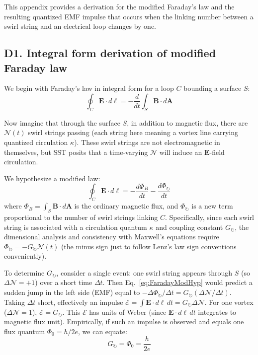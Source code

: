 \documentclass[10pt,reprint,aps,onecolumn,nofootinbib]{revtex4-2}
\begin{document}

This appendix provides a derivation for the modified Faraday’s law and the resulting quantized EMF impulse that occurs when the linking number between a swirl string and an electrical loop changes by one.

\subsection*{D1. Integral form derivation of modified Faraday law}

We begin with Faraday’s law in integral form for a loop $C$ bounding a surface $S$:
\begin{equation}
\oint_{C} \mathbf{E}\cdot d\bm{\ell} = -\frac{d}{dt}\int_{S} \mathbf{B}\cdot d\mathbf{A}
\label{eq:FaradayIntegral}
\end{equation}

Now imagine that through the surface $S$, in addition to magnetic flux, there are $\mathcal{N}(t)$ swirl strings passing (each string here meaning a vortex line carrying quantized circulation $\kappa$). These swirl strings are not electromagnetic in themselves, but SST posits that a time-varying $\mathcal{N}$ will induce an $\mathbf{E}$-field circulation.

We hypothesize a modified law:
\begin{equation}
\oint_C \mathbf{E}\cdot d\bm{\ell} = -\frac{d\Phi_B}{dt} - \frac{d\Phi_{\circlearrowright}}{dt}
\label{eq:FaradayModHyp}
\end{equation}
where $\Phi_B = \int_S \mathbf{B}\cdot d\mathbf{A}$ is the ordinary magnetic flux, and $\Phi_{\circlearrowright}$ is a new term proportional to the number of swirl strings linking $C$. Specifically, since each swirl string is associated with a circulation quantum $\kappa$ and coupling constant $G_{\circlearrowright}$, the dimensional analysis and consistency with Maxwell’s equations require $\Phi_{\circlearrowright} = -G_{\circlearrowright} \mathcal{N}(t)$ (the minus sign just to follow Lenz’s law sign conventions conveniently).

To determine $G_{\circlearrowright}$, consider a single event: one swirl string appears through $S$ (so $\Delta \mathcal{N} = +1$) over a short time $\Delta t$. Then Eq.~\eqref{eq:FaradayModHyp} would predict a sudden jump in the left side (EMF) equal to $-\Delta \Phi_{\circlearrowright}/\Delta t = G_{\circlearrowright} (\Delta \mathcal{N}/\Delta t)$. Taking $\Delta t$ short, effectively an impulse $\mathcal{E} = \int \mathbf{E}\cdot d\bm{\ell} \, dt = G_{\circlearrowright} \Delta \mathcal{N}$. For one vortex ($\Delta \mathcal{N}=1$), $\mathcal{E} = G_{\circlearrowright}$. This $\mathcal{E}$ has units of Weber (since $\mathbf{E}\cdot d\bm{\ell} \, dt$ integrates to magnetic flux unit). Empirically, if such an impulse is observed and equals one flux quantum $\Phi_0 = h/2e$, we can equate:
\begin{equation}
G_{\circlearrowright} = \Phi_0 = \frac{h}{2e}
\label{eq:GcircleValue}
\end{equation}
\end{document}
